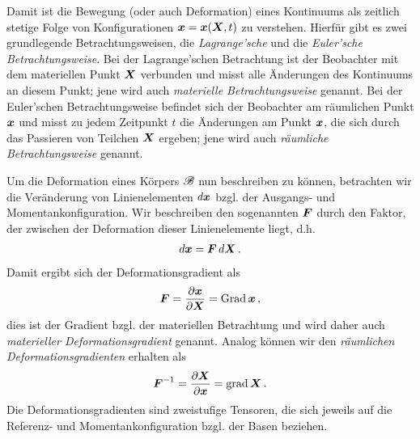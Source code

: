 Damit ist die Bewegung (oder auch Deformation) eines Kontinuums als zeitlich stetige Folge von Konfigurationen $\boldsymbol x = \boldsymbol x(\boldsymbol X,t)$ zu verstehen. Hierfür gibt es zwei grundlegende Betrachtungsweisen, die \textit{{Lagrange'sche}} und die \textit{Euler'sche Betrachtungsweise}. Bei der Lagrange'schen Betrachtung ist der Beobachter mit dem materiellen Punkt $\boldsymbol X$ verbunden und misst alle Änderungen des Kontinuums an diesem Punkt; jene wird auch \textit{materielle Betrachtungsweise} genannt. Bei der Euler'schen Betrachtungsweise befindet sich der Beobachter am räumlichen Punkt $\boldsymbol x$ und misst zu jedem Zeitpunkt $t$ die Änderungen am Punkt $\boldsymbol x$, die sich durch das Passieren von Teilchen $\boldsymbol X$ ergeben; jene wird auch \textit{räumliche Betrachtungsweise} genannt.


Um die Deformation eines Körpers $\mathscr B$ nun beschreiben zu können, betrachten wir die Veränderung von Linienelementen $d \boldsymbol x$ bzgl. der Ausgangs- und Momentankonfiguration. Wir beschreiben den sogenannten \textit{} $\boldsymbol F$ durch den Faktor, der zwischen der Deformation dieser Linienelemente liegt, d.h.
\begin{align}\label{eq:2.21}
	d\boldsymbol x = \boldsymbol F \, d\boldsymbol X \, .
\end{align}
Damit ergibt sich der Deformationsgradient als
\begin{align}\label{eq:2.22}
	\boldsymbol F = \frac{\partial \boldsymbol x}{\partial \boldsymbol X} = \operatorname{Grad} \boldsymbol x \, , 
\end{align}
dies ist der Gradient bzgl. der materiellen Betrachtung und wird daher auch \textit{materieller Deformationsgradient} genannt. Analog können wir den \textit{räumlichen Deformationsgradienten} erhalten als
\begin{align}\label{eq:2.23}
	\boldsymbol F^{-1} = \frac{\partial \boldsymbol X}{\partial \boldsymbol x} = \operatorname{grad} \boldsymbol X \, .
\end{align}
Die Deformationsgradienten sind zweistufige Tensoren, die sich jeweils auf die Referenz- und Momentankonfiguration bzgl. der Basen beziehen.

